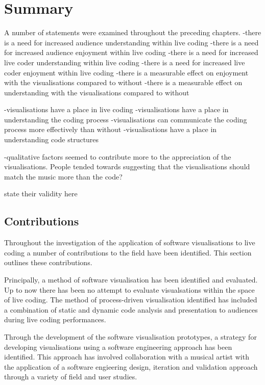
\chapter{Summary}
\label{chap:summary}

A number of statements were examined throughout the preceding chapters.
-there is a need for increased audience understanding within live coding
-there is a need for increased audience enjoyment within live coding
-there is a need for increased live coder understanding within live coding
-there is a need for increased live coder enjoyment within live coding
-there is a measurable effect on enjoyment with the visualisations compared to without
-there is a measurable effect on understanding with the visualisations compared to without

-visualisations have a place in live coding
-visualisations have a place in understanding the coding process
-visualisations can communicate the coding process more effectively than without
-visualisations have a place in understanding code structures

-qualitative factors seemed to contribute more to the appreciation of the visualisations. People tended towards suggesting that the visualisations should match the music more than the code?

{\color{red} state their validity here}

\section{Contributions}

Throughout the investigation of the application of software visualisations to live coding a number of contributions to the field have been identified. This section outlines these contributions.

Principally, a method of software visualisation has been identified and evaluated. Up to now there has been no attempt to evaluate visualsations within the space of live coding. The method of process-driven visualisation identified has included a combination of static and dynamic code analysis and presentation to audiences during live coding performances.

Through the development of the software visualisation prototypes, a strategy for developing visualisations using a software engineering approach has been identified. This approach has involved collaboration with a musical artist with the application of a software engieering design, iteration and validation approach through a variety of field and user studies.

